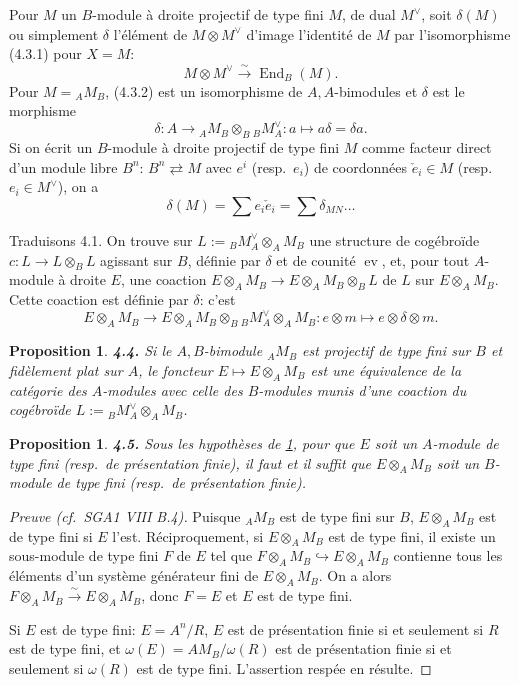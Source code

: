 \documentclass[12pt,a4paper]{article}
\theoremstyle{plain}
\newtheorem{proposition}[theorem]{Proposition}
\theoremstyle{definition}
\theoremstyle{remark}
\DeclareMathOperator{\End}{End}
\DeclareMathOperator{\ev}{ev}
\begin{document}
Pour $M$ un $B$-module à droite projectif de type fini $M$, de dual $M^\vee$, soit $\delta(M)$ ou simplement $\delta$ l'élément de $M \otimes M^\vee$ d'image l'identité de $M$ par l'isomorphisme (4.3.1) pour $X = M$:
\begin{equation}\label{eq:4.3.2}
M \otimes M^\vee \xrightarrow{\sim} \End_B(M).
\end{equation}
Pour $M = {}_A M_B$, (4.3.2) est un isomorphisme de $A,A$-bimodules et $\delta$ est le morphisme
\[
\delta : A \to {}_A M_B \otimes_B {}_B M_A^\vee : a \mapsto a\delta = \delta a.
\]
Si on écrit un $B$-module à droite projectif de type fini $M$ comme facteur direct d'un module libre $B^n$: $B^n \rightleftarrows M$ avec $e^i$ (resp.~$e_i$) de coordonnées $\check{e}_i \in M$ (resp.~$e_i \in M^\vee$), on a
\begin{equation}\label{eq:4.3.3}
\delta(M) = \sum e_i \check{e}_i = \sum \delta_{MN} \ldots
\end{equation}

Traduisons 4.1. On trouve sur $L := {}_B M_A^\vee \otimes_A M_B$ une structure de cogébroïde $c : L \to L \otimes_B L$ agissant sur $B$, définie par $\delta$ et de counité $\ev$, et, pour tout $A$-module à droite $E$, une coaction $E \otimes_A M_B \to E \otimes_A M_B \otimes_B L$ de $L$ sur $E \otimes_A M_B$. Cette coaction est définie par $\delta$: c'est
\[
E \otimes_A M_B \to E \otimes_A M_B \otimes_B {}_B M_A^\vee \otimes_A M_B : e \otimes m \mapsto e \otimes \delta \otimes m.
\]

\begin{proposition}\label{prop:4.4}
\textbf{4.4.} Si le $A,B$-bimodule ${}_A M_B$ est projectif de type fini sur $B$ et fidèlement plat sur $A$, le foncteur $E \mapsto E \otimes_A M_B$ est une équivalence de la catégorie des $A$-modules avec celle des $B$-modules munis d'une coaction du cogébroïde $L := {}_B M_A^\vee \otimes_A M_B$.
\end{proposition}

\begin{proposition}\label{prop:4.5}
\textbf{4.5.} Sous les hypothèses de \ref{prop:4.4}, pour que $E$ soit un $A$-module de type fini (resp.~de présentation finie), il faut et il suffit que $E \otimes_A M_B$ soit un $B$-module de type fini (resp.~de présentation finie).
\end{proposition}

\begin{proof}[Preuve (cf.~SGA1 VIII B.4)]
Puisque ${}_A M_B$ est de type fini sur $B$, $E \otimes_A M_B$ est de type fini si $E$ l'est. Réciproquement, si $E \otimes_A M_B$ est de type fini, il existe un sous-module de type fini $F$ de $E$ tel que $F \otimes_A M_B \hookrightarrow E \otimes_A M_B$ contienne tous les éléments d'un système générateur fini de $E \otimes_A M_B$. On a alors $F \otimes_A M_B \xrightarrow{\sim} E \otimes_A M_B$, donc $F = E$ et $E$ est de type fini.

Si $E$ est de type fini: $E = A^n/R$, $E$ est de présentation finie si et seulement si $R$ est de type fini, et $\omega(E) = A M_B / \omega(R)$ est de présentation finie si et seulement si $\omega(R)$ est de type fini. L'assertion respée en résulte.
\end{proof}
\end{document}
